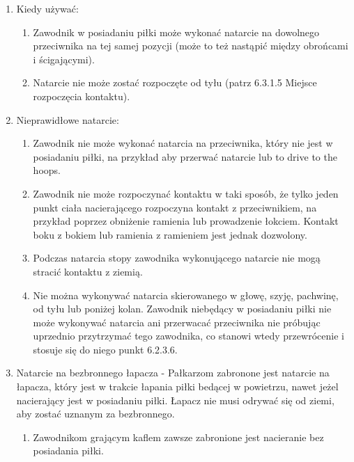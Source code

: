 \documentclass[12pt]{article}
\begin{document}
\begin{enumerate}
\item
    Kiedy używać:
  
  \begin{enumerate}
  \item
        Zawodnik w posiadaniu piłki może wykonać natarcie na dowolnego
    przeciwnika na tej samej pozycji (może to też nastąpić między
    obrońcami i ścigającymi).
      \item
        Natarcie nie może zostać rozpoczęte od tyłu (patrz 6.3.1.5 Miejsce
    rozpoczęcia kontaktu).
      \end{enumerate}
\item
    Nieprawidłowe natarcie:
  
  \begin{enumerate}
  \item
        Zawodnik nie może wykonać natarcia na przeciwnika, który nie jest w
    posiadaniu piłki, na przykład aby przerwać natarcie lub to drive to
    the hoops.
      \item
        Zawodnik nie może rozpoczynać kontaktu w taki sposób, że tylko jeden
    punkt ciała nacierającego rozpoczyna kontakt z przeciwnikiem, na
    przykład poprzez obniżenie ramienia lub prowadzenie łokciem. Kontakt
    boku z bokiem lub ramienia z ramieniem jest jednak dozwolony.
      \item
        Podczas natarcia stopy zawodnika wykonującego natarcie nie mogą
    stracić kontaktu z ziemią.
      \item
        Nie można wykonywać natarcia skierowanego w głowę, szyję, pachwinę,
    od tyłu lub poniżej kolan. Zawodnik niebędący w posiadaniu piłki nie
    może wykonywać natarcia ani przerwacać przeciwnika nie próbując
    uprzednio przytrzymać tego zawodnika, co stanowi wtedy przewrócenie
    i stosuje się do niego punkt 6.2.3.6.
      \end{enumerate}
\item
    Natarcie na bezbronnego łapacza - Pałkarzom zabronone jest natarcie na
  łapacza, który jest w trakcie łapania piłki bedącej w powietrzu, nawet
  jeżel nacierający jest w posiadaniu piłki. Łapacz nie musi odrywać się
  od ziemi, aby zostać uznanym za bezbronnego.
  
  \begin{enumerate}
  \item
        Zawodnikom grającym kaflem zawsze zabronione jest nacieranie bez
    posiadania piłki.
      \end{enumerate}
\end{enumerate}
\end{document}
